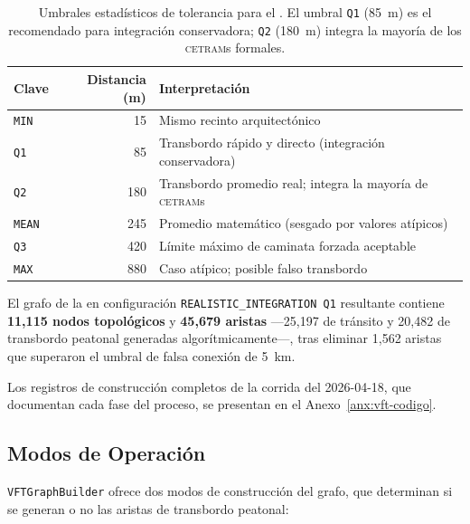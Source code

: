 \begin{table}[H]
    \centering
    \caption[Umbrales estadísticos de transbordo peatonal en VFTModel]{Umbrales
    estadísticos de tolerancia para el .
    El umbral \texttt{Q1} (85~m) es el recomendado para integración conservadora;
    \texttt{Q2} (180~m) integra la mayoría de los \textsc{cetram}s formales.}
    \label{tab:vft-umbrales}
    \begin{tabularx}{\textwidth}{|l|r|X|}
        \hline
        \textbf{Clave} & \textbf{Distancia (m)} & \textbf{Interpretación} \\
        \hline
        \texttt{MIN}  &  15 & Mismo recinto arquitectónico \\
        \texttt{Q1}   &  85 & Transbordo rápido y directo (integración conservadora) \\
        \texttt{Q2}   & 180 & Transbordo promedio real; integra la mayoría de \textsc{cetram}s \\
        \texttt{MEAN} & 245 & Promedio matemático (sesgado por valores atípicos) \\
        \texttt{Q3}   & 420 & Límite máximo de caminata forzada aceptable \\
        \texttt{MAX}  & 880 & Caso atípico; posible falso transbordo \\
        \hline
    \end{tabularx}
\end{table}

El grafo de la \zmvm{} en configuración \texttt{REALISTIC\_\allowbreak{}INTEGRATION Q1}
resultante contiene \textbf{11{,}115 nodos topológicos} y
\textbf{45{,}679 aristas} —25{,}197 de tránsito y 20{,}482 de transbordo
peatonal generadas algorítmicamente—, tras eliminar 1{,}562 aristas que
superaron el umbral de falsa conexión de 5~km.

Los registros de construcción completos de la corrida del 2026-04-18, que documentan cada fase del proceso, se presentan en el Anexo~\ref{anx:vft-codigo}.

\subsection{Modos de Operación}
\label{subsec:vft-modos}

\texttt{VFTGraphBuilder} ofrece dos modos de construcción del grafo, que
determinan si se generan o no las aristas de transbordo peatonal:

